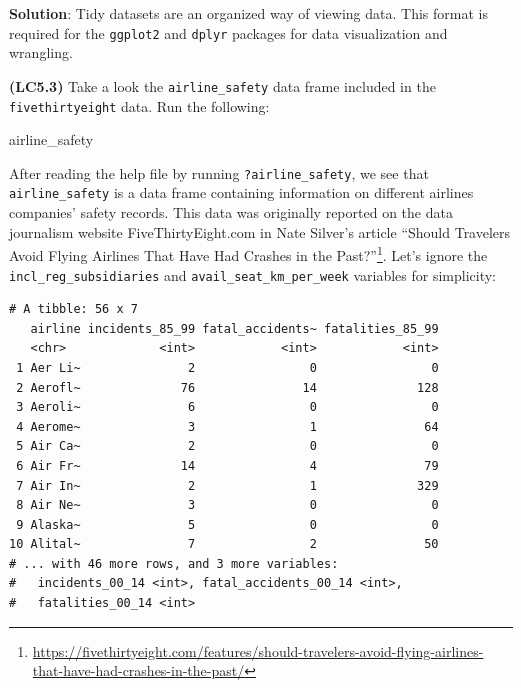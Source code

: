 \documentclass[12pt, krantz2,]{krantz}
\makeatletter
\newenvironment{Shaded}{\begin{snugshade}}{\end{snugshade}}
\newcommand{\KeywordTok}[1]{\textcolor[rgb]{0.27,0.27,0.27}{\textbf{#1}}}
\newcommand{\NormalTok}[1]{#1}
\newcommand{\OperatorTok}[1]{\textcolor[rgb]{0.43,0.43,0.43}{\textbf{#1}}}
\newcommand{\StringTok}[1]{\textcolor[rgb]{0.5,0.5,0.5}{#1}}
\renewcommand{\href}[2]{#2\footnote{\url{#1}}}
\newenvironment{kframe}{%
\medskip{}
\setlength{\fboxsep}{.8em}
 \def\at@end@of@kframe{}%
 \ifinner\ifhmode%
  \def\at@end@of@kframe{\end{minipage}}%
  \begin{minipage}{\columnwidth}%
 \fi\fi%
 \def\FrameCommand##1{\hskip\@totalleftmargin \hskip-\fboxsep
 \colorbox{shadecolor}{##1}\hskip-\fboxsep
     \hskip-\linewidth \hskip-\@totalleftmargin \hskip\columnwidth}%
 \MakeFramed {\advance\hsize-\width
   \@totalleftmargin\z@ \linewidth\hsize
   \@setminipage}}%
 {\par\unskip\endMakeFramed%
 \at@end@of@kframe}
\renewenvironment{Shaded}{\begin{kframe}}{\end{kframe}}
\makeatother
\begin{document}
\textbf{Solution}: Tidy datasets are an organized way of viewing data. This format is required for the \texttt{ggplot2} and \texttt{dplyr} packages for data visualization and wrangling.

\textbf{(LC5.3)} Take a look the \texttt{airline\_safety} data frame included in the \texttt{fivethirtyeight} data. Run the following:

\begin{Shaded}
\begin{Highlighting}[]
\NormalTok{airline_safety}
\end{Highlighting}
\end{Shaded}

After reading the help file by running \texttt{?airline\_safety}, we see that \texttt{airline\_safety} is a data frame containing information on different airlines companies' safety records. This data was originally reported on the data journalism website FiveThirtyEight.com in Nate Silver's article \href{https://fivethirtyeight.com/features/should-travelers-avoid-flying-airlines-that-have-had-crashes-in-the-past/}{``Should Travelers Avoid Flying Airlines That Have Had Crashes in the Past?''}. Let's ignore the \texttt{incl\_reg\_subsidiaries} and \texttt{avail\_seat\_km\_per\_week} variables for simplicity:

\begin{Shaded}
\end{Shaded}

\begin{verbatim}
# A tibble: 56 x 7
   airline incidents_85_99 fatal_accidents~ fatalities_85_99
   <chr>             <int>            <int>            <int>
 1 Aer Li~               2                0                0
 2 Aerofl~              76               14              128
 3 Aeroli~               6                0                0
 4 Aerome~               3                1               64
 5 Air Ca~               2                0                0
 6 Air Fr~              14                4               79
 7 Air In~               2                1              329
 8 Air Ne~               3                0                0
 9 Alaska~               5                0                0
10 Alital~               7                2               50
# ... with 46 more rows, and 3 more variables:
#   incidents_00_14 <int>, fatal_accidents_00_14 <int>,
#   fatalities_00_14 <int>
\end{verbatim}
\end{document}
